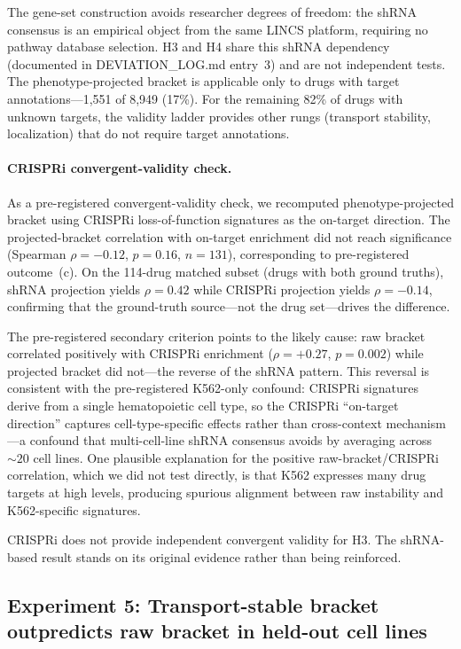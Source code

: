 \documentclass[10pt]{article}
\begin{document}
The gene-set construction avoids researcher degrees of freedom: the shRNA
consensus is an empirical object from the same LINCS platform,
requiring no pathway database selection. H3 and H4 share this shRNA
dependency (documented in DEVIATION\_LOG.md entry~3) and are not
independent tests. The phenotype-projected bracket is applicable only
to drugs with target annotations---1{,}551 of 8{,}949 (17\%). For the
remaining 82\% of drugs with unknown targets, the validity ladder
provides other rungs (transport stability, localization) that do not
require target annotations.

\paragraph{CRISPRi convergent-validity check.}
As a pre-registered convergent-validity check, we recomputed
phenotype-projected bracket using CRISPRi loss-of-function signatures
\citep{replogle2022mapping} as the on-target
direction. The projected-bracket correlation with on-target enrichment
did not reach significance (Spearman $\rho = -0.12$, $p = 0.16$,
$n = 131$), corresponding to pre-registered outcome~(c). On the
114-drug matched subset (drugs with both ground truths), shRNA
projection yields $\rho = 0.42$ while CRISPRi projection yields
$\rho = -0.14$, confirming that the ground-truth source---not the
drug set---drives the difference.

The pre-registered secondary criterion points to the likely cause: raw
bracket correlated positively with CRISPRi enrichment
($\rho = +0.27$, $p = 0.002$) while projected bracket did not---the
reverse of the shRNA pattern. This reversal is consistent with the
pre-registered K562-only confound: CRISPRi signatures derive from a
single hematopoietic cell type, so the CRISPRi ``on-target direction''
captures cell-type-specific effects rather than cross-context
mechanism---a confound that multi-cell-line shRNA consensus avoids by
averaging across ${\sim}20$ cell lines. One plausible explanation for
the positive raw-bracket/CRISPRi correlation, which we did not test
directly, is that K562 expresses many drug targets at high levels,
producing spurious alignment between raw instability and K562-specific
signatures.

CRISPRi does not provide independent convergent validity for H3. The
shRNA-based result stands on its original evidence rather than being
reinforced.

\subsection{Experiment 5: Transport-stable bracket outpredicts raw bracket in held-out cell lines}
\end{document}
